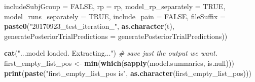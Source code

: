 \documentclass[]{article}
\newenvironment{Shaded}{\begin{snugshade}}{\end{snugshade}}
\newcommand{\KeywordTok}[1]{\textcolor[rgb]{0.13,0.29,0.53}{\textbf{{#1}}}}
\newcommand{\DataTypeTok}[1]{\textcolor[rgb]{0.13,0.29,0.53}{{#1}}}
\newcommand{\StringTok}[1]{\textcolor[rgb]{0.31,0.60,0.02}{{#1}}}
\newcommand{\CommentTok}[1]{\textcolor[rgb]{0.56,0.35,0.01}{\textit{{#1}}}}
\newcommand{\OtherTok}[1]{\textcolor[rgb]{0.56,0.35,0.01}{{#1}}}
\newcommand{\NormalTok}[1]{{#1}}
\begin{document}
\begin{Shaded}
\begin{Highlighting}[]
{{                  \DataTypeTok{includeSubjGroup =} \OtherTok{FALSE}\NormalTok{, }\DataTypeTok{rp =} \NormalTok{rp, }\DataTypeTok{model_rp_separately =} \OtherTok{TRUE}\NormalTok{, }
                  \DataTypeTok{model_runs_separately =} \OtherTok{TRUE}\NormalTok{, }\DataTypeTok{include_pain =} \OtherTok{FALSE}\NormalTok{, }\DataTypeTok{fileSuffix =} \KeywordTok{paste0}\NormalTok{(}\StringTok{"20170923_test_iteration_"}\NormalTok{, }
                    \KeywordTok{as.character}\NormalTok{(t), }\DataTypeTok{generatePosteriorTrialPredictions =} \NormalTok{generatePosteriorTrialPredictions))}
                
                \KeywordTok{cat}\NormalTok{(}\StringTok{"...model loaded. Extracting..."}\NormalTok{)}
                \CommentTok{# save just the output we want.}
                \NormalTok{first_empty_list_pos <-}\StringTok{ }\KeywordTok{min}\NormalTok{(}\KeywordTok{which}\NormalTok{(}\KeywordTok{sapply}\NormalTok{(model.summaries, is.null)))}
                \KeywordTok{print}\NormalTok{(}\KeywordTok{paste}\NormalTok{(}\StringTok{"first_empty_list_pos is"}\NormalTok{, }\KeywordTok{as.character}\NormalTok{(first_empty_list_pos)))}
                
}}
\end{Highlighting}
\end{Shaded}
\end{document}
